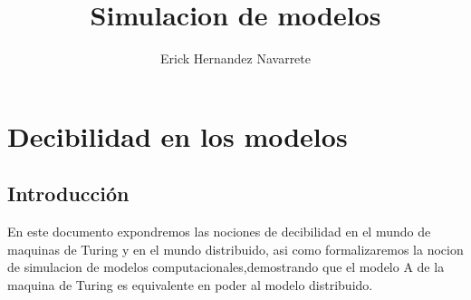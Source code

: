 \documentclass[10pt a4paper]{report}
\author{Erick Hernandez Navarrete}
\title{Simulacion de modelos}
\begin{document}
    \maketitle
    \chapter{Decibilidad en los modelos}\label{ch:decibilidad-en-los-modelos}
    \section{Introducción}\label{sec:introducción}
    En este documento expondremos las nociones de decibilidad
    en el mundo de maquinas de Turing y en el mundo distribuido,
    asi como formalizaremos la nocion de simulacion de modelos
    computacionales,demostrando que el modelo A de la maquina de
    Turing es equivalente en poder al modelo distribuido.
\end{document}
